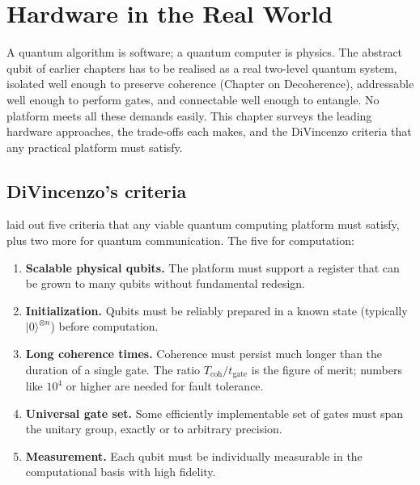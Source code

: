 \chapter{Hardware in the Real World}


A quantum algorithm is software; a quantum computer is physics. The abstract qubit of earlier chapters has to be realised as a real two-level quantum system, isolated well enough to preserve coherence (Chapter on Decoherence), addressable well enough to perform gates, and connectable well enough to entangle. No platform meets all these demands easily. This chapter surveys the leading hardware approaches, the trade-offs each makes, and the DiVincenzo criteria that any practical platform must satisfy.

\section{DiVincenzo's criteria}

\citet{divincenzo_physical_2000} laid out five criteria that any viable quantum computing platform must satisfy, plus two more for quantum communication. The five for computation:

\begin{enumerate}
\item \textbf{Scalable physical qubits.} The platform must support a register that can be grown to many qubits without fundamental redesign.
\item \textbf{Initialization.} Qubits must be reliably prepared in a known state (typically $|0\rangle^{\otimes n}$) before computation.
\item \textbf{Long coherence times.} Coherence must persist much longer than the duration of a single gate. The ratio $T_{\text{coh}}/t_{\text{gate}}$ is the figure of merit; numbers like $10^4$ or higher are needed for fault tolerance.
\item \textbf{Universal gate set.} Some efficiently implementable set of gates must span the unitary group, exactly or to arbitrary precision.
\item \textbf{Measurement.} Each qubit must be individually measurable in the computational basis with high fidelity.
\end{enumerate}

